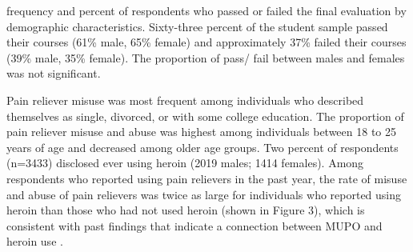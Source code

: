 \documentclass[sigconf]{acmart}
\begin{document}
frequency and percent of respondents who passed or
failed the final evaluation by demographic characteristics. Sixty-three percent 
of the student sample passed their courses (61\% male, 65\% female) and 
approximately 37\% failed their courses (39\% male, 35\% female). The 
proportion of pass/ fail between males and females was not significant. 


Pain reliever misuse was most frequent among individuals who described 
themselves as single, divorced, or with some college education. The 
proportion of pain reliever misuse and abuse was highest among individuals 
between 18 to 25 years of age and decreased among older age groups. Two 
percent of respondents (n=3433) disclosed ever using heroin (2019 males; 
1414 females). Among respondents who reported using pain relievers in the 
past year, the rate of misuse and abuse of pain relievers was twice as 
large for individuals who reported using heroin than those who had not 
used heroin (shown in Figure 3), which is consistent with past findings 
that indicate a connection between MUPO and heroin use 
\cite{muhuri13, unick13}.










\end{document}
